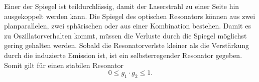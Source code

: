 Einer der Spiegel ist teildurchlässig, damit der Laserstrahl zu einer Seite hin ausgekoppelt werden kann.
Die Spiegel des optischen Resonators können aus zwei planparallelen, zwei sphärischen oder aus einer Kombination bestehen.
Damit es zu Oszillatorverhalten kommt, müssen die Verluste durch die Spiegel möglichst gering gehalten werden.
Sobald die Resonatorverlste kleiner als die Verstärkung durch die induzierte Emission ist, ist ein selbsterregender Resonator gegeben.
Somit gilt für einen stabilen Resonator
\begin{equation}
  0 \leq g_1 \cdot g_2 \leq 1.
\end{equation}
